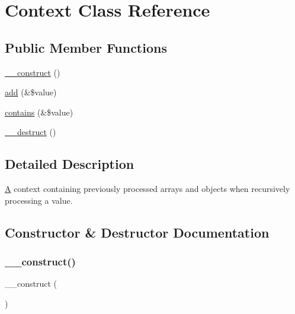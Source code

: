 \hypertarget{class_sebastian_bergmann_1_1_recursion_context_1_1_context}{}\section{Context Class Reference}
\label{class_sebastian_bergmann_1_1_recursion_context_1_1_context}
\subsection*{Public Member Functions}
\begin{DoxyCompactItemize}
\item 
\mbox{\hyperlink{class_sebastian_bergmann_1_1_recursion_context_1_1_context_a095c5d389db211932136b53f25f39685}{\+\_\+\+\_\+construct}} ()
\item 
\mbox{\hyperlink{class_sebastian_bergmann_1_1_recursion_context_1_1_context_af1ed54161c97c29f4c8c1714df6feccc}{add}} (\&\$value)
\item 
\mbox{\hyperlink{class_sebastian_bergmann_1_1_recursion_context_1_1_context_ab5894516f0a3adabdf1e5579d9ede76d}{contains}} (\&\$value)
\item 
\mbox{\hyperlink{class_sebastian_bergmann_1_1_recursion_context_1_1_context_a421831a265621325e1fdd19aace0c758}{\+\_\+\+\_\+destruct}} ()
\end{DoxyCompactItemize}


\subsection{Detailed Description}
\mbox{\hyperlink{class_a}{A}} context containing previously processed arrays and objects when recursively processing a value. 

\subsection{Constructor \& Destructor Documentation}
\mbox{\label{class_sebastian_bergmann_1_1_recursion_context_1_1_context_a095c5d389db211932136b53f25f39685}} 
\subsubsection{\texorpdfstring{\+\_\+\+\_\+construct()}{\_\_construct()}}
{\footnotesize\ttfamily \+\_\+\+\_\+construct (\begin{DoxyParamCaption}{ }\end{DoxyParamCaption})}

